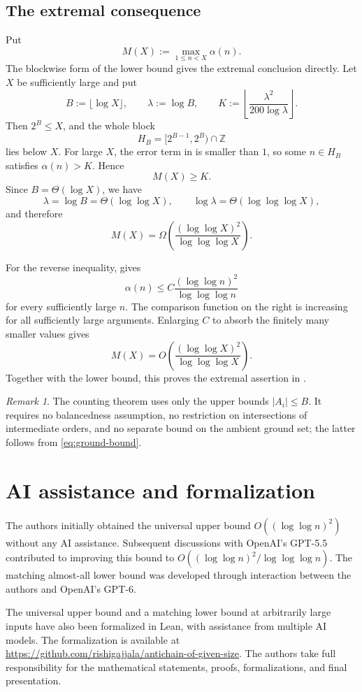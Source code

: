 \documentclass[11pt]{article}
\theoremstyle{definition}
\theoremstyle{remark}
\newtheorem{remark}[remark]{Remark}
\begin{document}
\subsection{The extremal consequence}

Put
\[
  M(X):=\max_{1\le n<X}\alpha(n).
\]
The blockwise form of the lower bound gives the extremal conclusion directly.
Let $X$ be sufficiently large and put
\[
  B:=\lfloor\log X\rfloor,
  \qquad \lambda:=\log B,
  \qquad
  K:=\left\lfloor\frac{\lambda^2}{200\log \lambda}\right\rfloor.
\]
Then $2^B\le X$, and the whole block
\[
  H_B=[2^{B-1},2^B)\cap\mathbb Z
\]
lies below $X$.  For large $X$, the error term in
 is smaller than $1$, so some $n\in H_B$
satisfies $\alpha(n)>K$.  Hence
\[
  M(X)\ge K.
\]
Since $B=\Theta(\log X)$, we have
\[
  \lambda=\log B=\Theta(\log\log X),
  \qquad
  \log \lambda=\Theta(\log\log\log X),
\]
and therefore
\[
  M(X)=\Omega\!\left(
    \frac{(\log\log X)^2}{\log\log\log X}
  \right).
\]

For the reverse inequality,  gives
\[
  \alpha(n)\le C\frac{(\log\log n)^2}{\log\log\log n}
\]
for every sufficiently large $n$.  The comparison function on the right is
increasing for all sufficiently large arguments.  Enlarging $C$ to absorb
the finitely many smaller values gives
\[
  M(X)=O\!\left(
    \frac{(\log\log X)^2}{\log\log\log X}
  \right).
\]
Together with the lower bound, this proves the extremal assertion in
.

\begin{remark}
The counting theorem uses only the upper bounds $|A_i|\le B$. It requires no
balancedness assumption, no restriction on intersections of intermediate
orders, and no separate bound on the ambient ground set; the latter follows
from \eqref{eq:ground-bound}.
\end{remark}

\section*{AI assistance and formalization}

The authors initially obtained the universal upper bound
$O((\log\log n)^2)$ without any AI assistance. Subsequent discussions with
OpenAI's GPT-5.5 contributed to improving this bound to
$O((\log\log n)^2/\log\log\log n)$. The matching almost-all
lower bound was developed through interaction
between the authors and OpenAI's GPT-6.

The universal upper bound and a matching lower bound at arbitrarily large
inputs have also been formalized in Lean, with assistance from multiple
AI models. The formalization is available at
\url{https://github.com/rishigajjala/antichain-of-given-size}.
The authors take full responsibility
for the mathematical statements, proofs, formalizations,
and final presentation.
\end{document}
